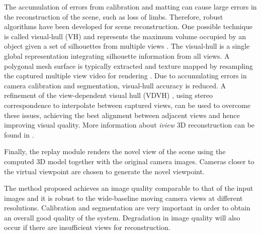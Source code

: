 The accumulation of errors from calibration and matting can cause large errors in
the reconstruction of the scene, such as loss of limbs. 
Therefore, robust algorithms have been developed for scene reconstruction.
One possible technique is called visual-hull (VH) and represents the maximum volume occupied by an object
given a set of silhouettes from multiple views \cite{2.2_iview_08}.
The visual-hull is a single global representation integrating silhouette information from all
views. A polygonal mesh surface is typically extracted and texture mapped by resampling
the captured multiple view video for rendering \cite{2.2_iview}.
Due to accumulating errors in camera calibration and segmentation, visual-hull accuracy is reduced.
A refinement of the view-dependent visual hull (VDVH) \cite{2.1_iview_12},
using stereo correspondence to interpolate between captured
views, can be used to overcome these issues, achieving the best alignment between adjacent views and 
hence improving visual quality.
More information about \textit{iview} 3D reconstruction can be found in \cite{02_iview,2.1_iview,2.2_iview}.

Finally, the replay module renders the novel view of the scene using the computed 3D model together with the
original camera images.
Cameras closer to the virtual viewpoint are chosen to generate the novel viewpoint.


The method proposed achieves an image quality comparable to that of the input images and it is robust to the
wide-baseline moving camera views at different resolutions.
Calibration and segmentation are very important in order to obtain an overall good quality of the system.
Degradation in image quality will also occur if there are insufficient views for reconstruction.







